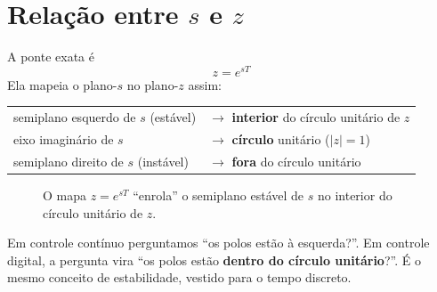 \section{Rela\c{c}\~ao entre $s$ e $z$}
A ponte exata \'e
\begin{equation}
\boxed{\ z = e^{sT}\ }
\end{equation}
Ela mapeia o plano-$s$ no plano-$z$ assim:
\begin{center}
\begin{tabular}{ll}
semiplano esquerdo de $s$ (est\'avel) & $\to$ \textbf{interior} do c\'irculo unit\'ario de $z$ \\
eixo imagin\'ario de $s$ & $\to$ \textbf{c\'irculo} unit\'ario ($|z|=1$) \\
semiplano direito de $s$ (inst\'avel) & $\to$ \textbf{fora} do c\'irculo unit\'ario \\
\end{tabular}
\end{center}

\begin{figure}[h]\centering
{}
\caption{O mapa $z=e^{sT}$ ``enrola'' o semiplano est\'avel de $s$ no interior do c\'irculo unit\'ario de $z$.}
\label{fig:zplane}
\end{figure}

\begin{intuicao}
Em controle cont\'inuo perguntamos ``os polos est\~ao \`a esquerda?''. Em controle
digital, a pergunta vira ``os polos est\~ao \textbf{dentro do c\'irculo
unit\'ario}?''. \'E o mesmo conceito de estabilidade, vestido para o tempo discreto.
\end{intuicao}

